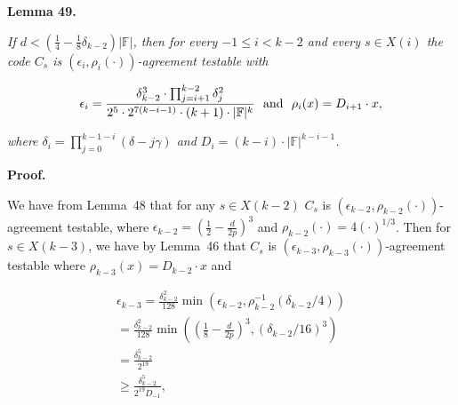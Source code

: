 

\par\medskip\noindent\textbf{
\textbf{Lemma 49}\textbf{.}
}\par



\emph{If $d<\left(\frac{1}{4}-\frac{1}{8}\delta_{k-2}\right)|\mathbb{F}|$, then for every $-1\leq i<k-2$ and every $s\in X(i)$ the code $C_{s}$ is $(\epsilon_{i},\rho_{i}(\cdot))$-agreement testable with}\par


\[\begin{gathered}
\epsilon_{i}=\frac{\delta_{k-2}^{3}\cdot\prod_{j=i+1}^{k-2}\delta_{j}^{2}}{2^{5}\cdot 2^{7(k-i-1)}\cdot(k+1)\cdot|\mathbb{F}|^{k}}\nobreak\ \nobreak\ \text{and}\nobreak\ \nobreak\ \rho_{i}(x)=D_{i+1}\cdot x,
\end{gathered}\]


\emph{where $\delta_{i}=\prod_{j=0}^{k-1-i}(\delta-j\gamma)$ and $D_{i}=(k-i)\cdot|\mathbb{F}|^{k-i-1}$.}\par







\par\medskip\noindent\textbf{Proof.}\par




We have from Lemma 48 that for any $s\in X(k-2)$ $C_{s}$ is $(\epsilon_{k-2},\rho_{k-2}(\cdot))$-agreement testable, where $\epsilon_{k-2}=\left(\frac{1}{2}-\frac{d}{2p}\right)^{3}$ and $\rho_{k-2}(\cdot)=4(\cdot)^{1/3}$. Then for $s\in X(k-3)$, we have by Lemma 46 that $C_{s}$ is $(\epsilon_{k-3},\rho_{k-3}(\cdot))$-agreement testable where $\rho_{k-3}(x)=D_{k-2}\cdot x$ and\par


\[\begin{gathered}
\displaystyle\epsilon_{k-3} \displaystyle=\frac{\delta_{k-2}^{2}}{128}\min\left(\epsilon_{k-2},\rho_{k-2}^{-1}\left(\delta_{k-2}/4\right)\right) \\
\displaystyle=\frac{\delta_{k-2}^{2}}{128}\min\left(\left(\frac{1}{8}-\frac{d}{2p}\right)^{3},\left(\delta_{k-2}/16\right)^{3}\right) \\
\displaystyle=\frac{\delta^{5}_{k-2}}{2^{19}} \\
\displaystyle\geq\frac{\delta_{k-2}^{5}}{2^{19}D_{-1}},
\end{gathered}\]


